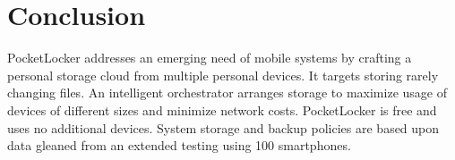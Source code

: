
\section{Conclusion}
\label{sec-conclusion}

PocketLocker addresses an emerging need of mobile systems by crafting a
personal storage cloud from multiple personal devices.  It targets storing
rarely changing files. An intelligent orchestrator arranges storage to
maximize usage of devices of different sizes and minimize network costs.
PocketLocker is free and uses no additional devices. System storage and
backup policies are based upon data gleaned from an extended testing using
100 smartphones.
